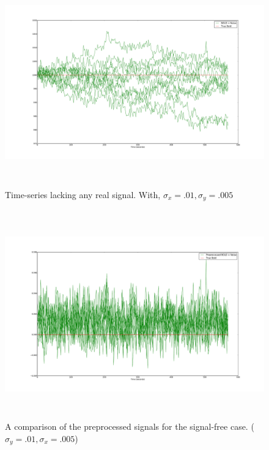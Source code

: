 \begin{figure}[H]
\centering
\includegraphics[clip=true,trim=6cm 3cm 6cm 3cm,height=9cm]{images/realization_noiseonly}
\caption{Time-series lacking any real signal. With, $\sigma_x = .01, \sigma_y=.005$}
\label{fig:NoiseOnly}
\end{figure}

\begin{figure}[H]
\centering
\includegraphics[clip=true,trim=6cm 3cm 6cm 3cm,height=9cm]{images/preprocessed_noiseonly}
\caption{A comparison of the preprocessed signals for the signal-free case. (
$\sigma_y = .01, \sigma_x = .005$)}
\label{fig:PreprocessedNoiseOnly}
\end{figure}


